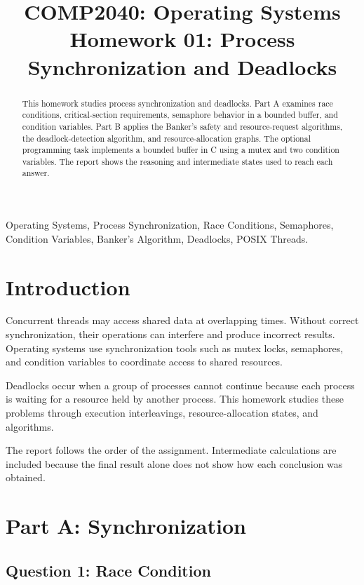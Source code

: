 \documentclass[conference]{IEEEtran}
\title{COMP2040: Operating Systems\\Homework 01: Process Synchronization and Deadlocks}
\author{
    \IEEEauthorblockN{Daniela Mendez Ramirez}
    \IEEEauthorblockA{\textit{College of Engineering and Computer Science}\\
    \textit{VinUniversity}, Hanoi, Vietnam}
}
\begin{document}
\maketitle

\begin{abstract}
This homework studies process synchronization and deadlocks. Part A examines race conditions, critical-section requirements, semaphore behavior in a bounded buffer, and condition variables. Part B applies the Banker's safety and resource-request algorithms, the deadlock-detection algorithm, and resource-allocation graphs. The optional programming task implements a bounded buffer in C using a mutex and two condition variables. The report shows the reasoning and intermediate states used to reach each answer.
\end{abstract}

\begin{IEEEkeywords}
Operating Systems, Process Synchronization, Race Conditions, Semaphores,
Condition Variables, Banker's Algorithm, Deadlocks, POSIX Threads.
\end{IEEEkeywords}

\section{Introduction}
Concurrent threads may access shared data at overlapping times. Without correct synchronization, their operations can interfere and produce incorrect results. Operating systems use synchronization tools such as mutex locks, semaphores, and condition variables to coordinate access to shared resources.

Deadlocks occur when a group of processes cannot continue because each process is waiting for a resource held by another process. This homework studies these problems through execution interleavings, resource-allocation states, and algorithms.

The report follows the order of the assignment. Intermediate calculations are included because the final result alone does not show how each conclusion was obtained.

\section{Part A: Synchronization}

\subsection{Question 1: Race Condition}
\end{document}

